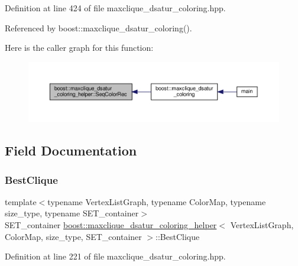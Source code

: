 Definition at line 424 of file maxclique\+\_\+dsatur\+\_\+coloring.\+hpp.



Referenced by boost\+::maxclique\+\_\+dsatur\+\_\+coloring().

Here is the caller graph for this function\+:
\nopagebreak
\begin{figure}[H]
\begin{center}
\leavevmode
\includegraphics[width=350pt]{d0/dd5/classboost_1_1maxclique__dsatur__coloring__helper_a5bd2cf2e839d9d424e788efec7a4dd60_icgraph}
\end{center}
\end{figure}


\subsection{Field Documentation}
\mbox{\label{classboost_1_1maxclique__dsatur__coloring__helper_ac0169f40ec490dbab8d0367919afd49c}} 
\subsubsection{\texorpdfstring{Best\+Clique}{BestClique}}
{\footnotesize\ttfamily template$<$typename Vertex\+List\+Graph, typename Color\+Map, typename size\+\_\+type, typename S\+E\+T\+\_\+container$>$ \\
S\+E\+T\+\_\+container \hyperlink{classboost_1_1maxclique__dsatur__coloring__helper}{boost\+::maxclique\+\_\+dsatur\+\_\+coloring\+\_\+helper}$<$ Vertex\+List\+Graph, Color\+Map, size\+\_\+type, S\+E\+T\+\_\+container $>$\+::Best\+Clique\hspace{0.3cm}{\ttfamily [private]}}



Definition at line 221 of file maxclique\+\_\+dsatur\+\_\+coloring.\+hpp.

